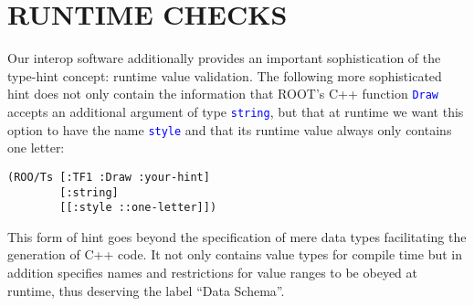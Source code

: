 \documentclass[twocolumn]{article}
\begin{document}
\section{RUNTIME CHECKS}
Our interop software additionally provides an important sophistication of the type-hint concept: runtime value validation. The following more sophisticated hint does not only contain the information that ROOT’s C++ function \texttt{\textcolor{blue}{Draw}} accepts an additional argument of type \texttt{\textcolor{blue}{string}}, but that at runtime we want this option to have the name \texttt{\textcolor{blue}{style}} and that its runtime value always only contains one letter:
{\color{blue}\begin{verbatim}
(ROO/Ts [:TF1 :Draw :your-hint]
        [:string]
        [[:style ::one-letter]])
\end{verbatim}}
This form of hint goes beyond the specification of mere data types facilitating the generation of C++ code. It not only contains value types for compile time but in addition specifies names and restrictions for value ranges to be obeyed at runtime, thus deserving the label “Data Schema”.
\end{document}
